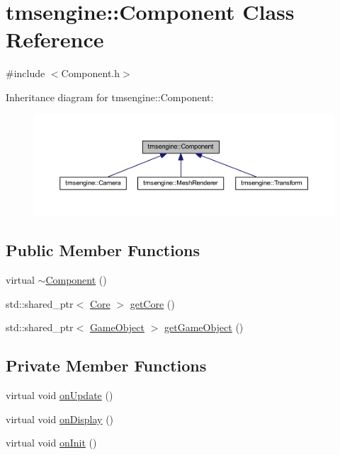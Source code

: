 \hypertarget{classtmsengine_1_1_component}{}\section{tmsengine\+:\+:Component Class Reference}
\label{classtmsengine_1_1_component}


{\ttfamily \#include $<$Component.\+h$>$}



Inheritance diagram for tmsengine\+:\+:Component\+:\nopagebreak
\begin{figure}[H]
\begin{center}
\leavevmode
\includegraphics[width=350pt]{classtmsengine_1_1_component__inherit__graph}
\end{center}
\end{figure}
\subsection*{Public Member Functions}
\begin{DoxyCompactItemize}
\item 
virtual \hyperlink{classtmsengine_1_1_component_a764458f5f009e4e01f3c2bdab24b992f}{$\sim$\+Component} ()
\item 
std\+::shared\+\_\+ptr$<$ \hyperlink{classtmsengine_1_1_core}{Core} $>$ \hyperlink{classtmsengine_1_1_component_a80494876282c5e19caeffe6c06c8d4bb}{get\+Core} ()
\item 
std\+::shared\+\_\+ptr$<$ \hyperlink{classtmsengine_1_1_game_object}{Game\+Object} $>$ \hyperlink{classtmsengine_1_1_component_a3df74e0c90f7519e3a9ab541dc77068a}{get\+Game\+Object} ()
\end{DoxyCompactItemize}
\subsection*{Private Member Functions}
\begin{DoxyCompactItemize}
\item 
virtual void \hyperlink{classtmsengine_1_1_component_a71284093fcc0b89f56fe78bd4da1c2e0}{on\+Update} ()
\item 
virtual void \hyperlink{classtmsengine_1_1_component_a73aa3564db299ef43100bd58d7cab65b}{on\+Display} ()
\item 
virtual void \hyperlink{classtmsengine_1_1_component_ae992e9b0c98b569eba13d0274089bc18}{on\+Init} ()
\end{DoxyCompactItemize}
